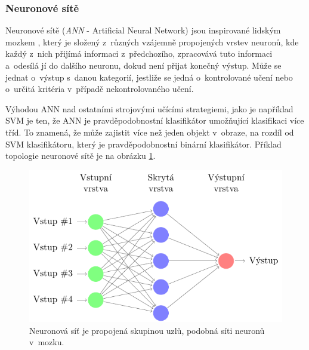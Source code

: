 \subsubsection*{Neuronové sítě}
Neuronové sítě (\textit{ANN} - Artificial Neural Network) jsou inspirované lidským mozkem \cite{ann}, který je složený z~různých vzájemně propojených vrstev neuronů, kde každý z~nich přijímá informaci z~předchozího, zpracovává tuto informaci a~odesílá jí do dalšího neuronu, dokud není přijat konečný výstup. Může se jednat o~výstup s~danou kategorií, jestliže se jedná o~kontrolované učení nebo o~určitá kritéria v~případě nekontrolovaného učení.

Výhodou ANN nad ostatními strojovými učícími strategiemi, jako je například SVM je ten, že ANN je pravděpodobnostní klasifikátor umožňující klasifikaci více tříd. To znamená, že může zajistit více než jeden objekt v~obraze, na rozdíl od SVM klasifikátoru, který je pravděpodobnostní binární klasifikátor. Příklad topologie neuronové sítě je na obrázku \ref{fig:ann}. 
\begin{figure}[H]
\centering
\includegraphics[width=.87\linewidth]{figures/ann.pdf}
\caption{Neuronová síť je propojená skupinou uzlů, podobná síti neuronů v~mozku.}
\label{fig:ann}
\end{figure}

